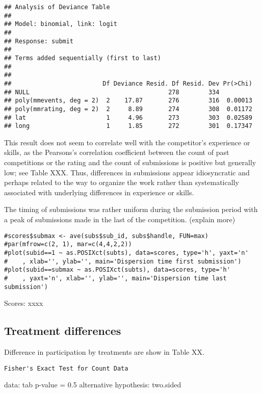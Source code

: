 \documentclass[12pt,]{article}
\begin{document}
\begin{verbatim}
## Analysis of Deviance Table
## 
## Model: binomial, link: logit
## 
## Response: submit
## 
## Terms added sequentially (first to last)
## 
## 
##                         Df Deviance Resid. Df Resid. Dev Pr(>Chi)
## NULL                                      278        334         
## poly(mmevents, deg = 2)  2    17.87       276        316  0.00013
## poly(mmrating, deg = 2)  2     8.89       274        308  0.01172
## lat                      1     4.96       273        303  0.02589
## long                     1     1.85       272        301  0.17347
\end{verbatim}

This result does not seem to correlate well with the competitor's
experience or skills, as the Pearsons's correlation coefficient between
the count of past competitions or the rating and the count of
submissions is positive but generally low; see Table XXX. Thus,
differences in submissions appear idiosyncratic and perhaps related to
the way to organize the work rather than systematically associated with
underlying differences in experience or skills.

The timing of submissions was rather uniform during the submission
period with a peak of submissions made in the last of the competition.
(explain more)

\begin{verbatim}
#scores$submax <- ave(subs$sub_id, subs$handle, FUN=max)
#par(mfrow=c(2, 1), mar=c(4,4,2,2))
#plot(subid==1 ~ as.POSIXct(subts), data=scores, type='h', yaxt='n'
#    , xlab='', ylab='', main='Dispersion time first submission')
#plot(subid==submax ~ as.POSIXct(subts), data=scores, type='h'
#    , yaxt='n', xlab='', ylab='', main='Dispersion time last submission')
\end{verbatim}

Scores: xxxx

\subsection{Treatment differences}\label{treatment-differences}

Difference in participation by treatments are show in Table XX.

\begin{verbatim}
Fisher's Exact Test for Count Data
\end{verbatim}

data: tab p-value = 0.5 alternative hypothesis: two.sided
\end{document}
